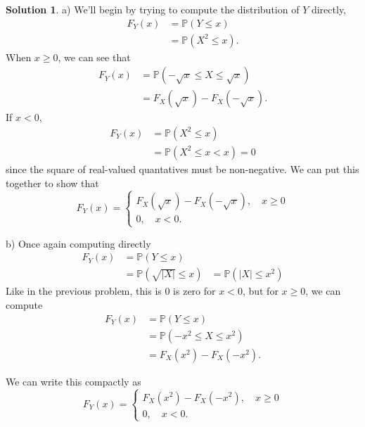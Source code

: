 \documentclass[12pt]{article}
\newcommand{\Prob}{\mathbb{P}}
\newcommand{\abs}[1]{ \left| #1 \right| }
\theoremstyle{definition}
\newtheorem{sol}{Solution}
\theoremstyle{remark}
\begin{document}
\begin{sol}
    a) We'll begin by trying to compute the distribution of $Y$ directly,
\begin{align}
    F_Y(x) &= \Prob(Y \leq x)\\
           &= \Prob(X^2 \leq x).
\end{align}
When $x\geq0$, we can see that
\begin{align}
    F_Y(x) &= \Prob(-\sqrt{x} \leq X \leq \sqrt{x})\\
           &= F_X(\sqrt{x}) - F_X(-\sqrt{x}).
\end{align}
If $x<0$,
\begin{align}
    F_Y(x) &= \Prob( X^2 \leq x )\\
           &= \Prob(X^2 \leq x < x) = 0
\end{align}
since the square of real-valued quantatives must be non-negative. We can put this together to show that
\begin{equation}
    F_Y(x) = \begin{cases}
        F_X(\sqrt{x}) - F_X(-\sqrt{x}), \quad x \geq 0\\
        0, \quad x < 0. 
    \end{cases}
\end{equation}

b) Once again computing directly
\begin{align}
    F_Y(x) &= \Prob(Y \leq x)\\
           &= \Prob(\sqrt{\abs{X}} \leq x)
           &= \Prob(\abs{X} \leq x^2)
\end{align}
Like in the previous problem, this is 0 is zero for $x<0$, but for $x\geq0$, we can compute
\begin{align}
    F_Y(x) &= \Prob(Y\leq x)\\
           &= \Prob(-x^2 \leq X \leq x^2)\\
           &= F_X(x^2) - F_X(-x^2).
\end{align}

We can write this compactly as 
\begin{equation}
    F_Y(x) = \begin{cases}
        F_X(x^2) - F_X(-x^2), \quad x \geq 0\\
        0, \quad x < 0. 
    \end{cases}
\end{equation}


\end{sol}
\end{document}
